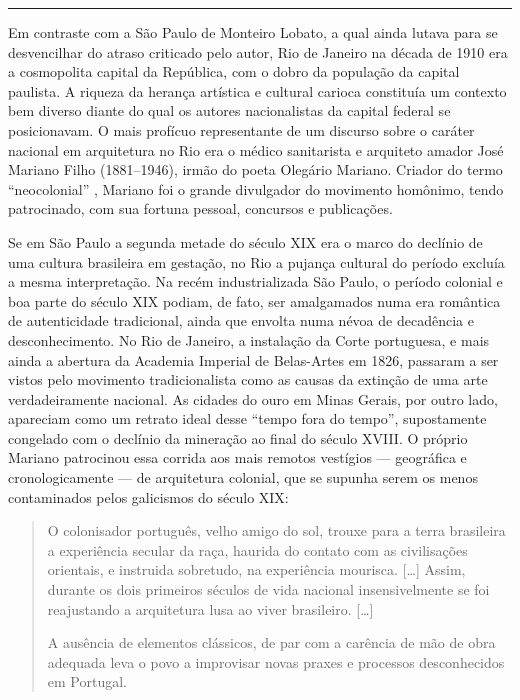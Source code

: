 \begin{center}\rule{0.5\linewidth}{0.5pt}\end{center}

Em contraste com a São Paulo de Monteiro Lobato, a qual ainda lutava
para se desvencilhar do atraso criticado pelo autor, Rio de Janeiro na
década de 1910 era a cosmopolita capital da República, com o dobro da
população da capital paulista. A riqueza da herança artística e cultural
carioca constituía um contexto bem diverso diante do qual os autores
nacionalistas da capital federal se posicionavam. O mais profícuo
representante de um discurso sobre o caráter nacional em arquitetura no
Rio era o médico sanitarista e arquiteto amador José Mariano Filho
(1881--1946), irmão do poeta Olegário Mariano. Criador do termo
``neocolonial'' \autocite[p.~132]{kessel:2008arquitetura}, Mariano foi o
grande divulgador do movimento homônimo, tendo patrocinado, com sua
fortuna pessoal, concursos e publicações.

Se em São Paulo a segunda metade do século XIX era o marco do declínio
de uma cultura brasileira em gestação, no Rio a pujança cultural do
período excluía a mesma interpretação. Na recém industrializada São
Paulo, o período colonial e boa parte do século XIX podiam, de fato, ser
amalgamados numa era romântica de autenticidade tradicional, ainda que
envolta numa névoa de decadência e desconhecimento. No Rio de Janeiro, a
instalação da Corte portuguesa, e mais ainda a abertura da Academia
Imperial de Belas-Artes em 1826, passaram a ser vistos pelo movimento
tradicionalista como as causas da extinção de uma arte verdadeiramente
nacional. As cidades do ouro em Minas Gerais, por outro lado, apareciam
como um retrato ideal desse ``tempo fora do tempo'', supostamente
congelado com o declínio da mineração ao final do século XVIII. O
próprio Mariano patrocinou essa corrida aos mais remotos vestígios ---
geográfica e cronologicamente --- de arquitetura colonial, que se
supunha serem os menos contaminados pelos galicismos do século XIX:

\begin{quote}
O colonisador português, velho amigo do sol, trouxe para a terra
brasileira a experiência secular da raça, haurida do contato com as
civilisações orientais, e instruida sobretudo, na experiência mourisca.
{[}\ldots{]} Assim, durante os dois primeiros séculos de vida nacional
insensivelmente se foi reajustando a arquitetura lusa ao viver
brasileiro. {[}\ldots{]}

A ausência de elementos clássicos, de par com a carência de mão de obra
adequada leva o povo a improvisar novas praxes e processos desconhecidos
em Portugal. \autocite[p.~9--10]{mariannofilho:1943margem}
\end{quote}

